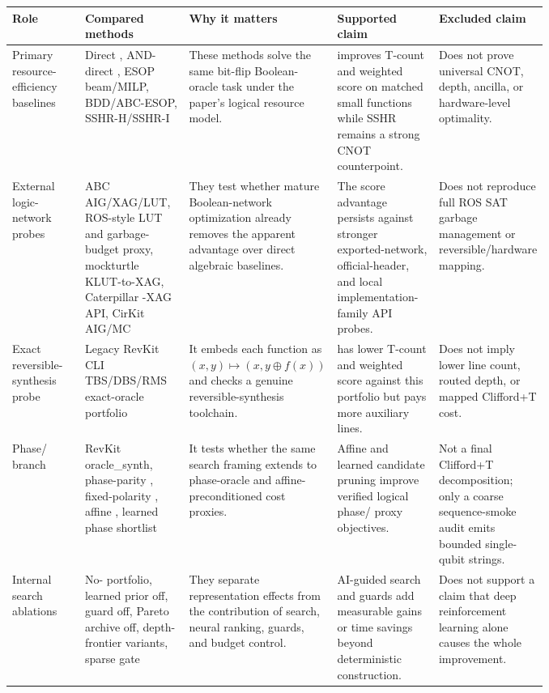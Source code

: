\begin{tabularx}{\linewidth}{>{\raggedright\arraybackslash}p{0.16\linewidth}>{\raggedright\arraybackslash}p{0.21\linewidth}>{\raggedright\arraybackslash}X>{\raggedright\arraybackslash}p{0.21\linewidth}>{\raggedright\arraybackslash}p{0.19\linewidth}}
\toprule
Role & Compared methods & Why it matters & Supported claim & Excluded claim \\
\midrule
Primary resource-efficiency baselines & Direct \anf{}, AND-direct \anf{}, ESOP beam/MILP, BDD/ABC-ESOP, SSHR-H/SSHR-I & These methods solve the same bit-flip Boolean-oracle task under the paper's logical resource model. & \method{} improves T-count and weighted score on matched small functions while SSHR remains a strong CNOT counterpoint. & Does not prove universal CNOT, depth, ancilla, or hardware-level optimality. \\
External logic-network probes & ABC AIG/XAG/LUT, ROS-style LUT and garbage-budget proxy, mockturtle KLUT-to-XAG, Caterpillar \anf{}-XAG API, CirKit AIG/MC & They test whether mature Boolean-network optimization already removes the apparent advantage over direct algebraic baselines. & The score advantage persists against stronger exported-network, official-header, and local implementation-family API probes. & Does not reproduce full ROS SAT garbage management or reversible/hardware mapping. \\
Exact reversible-synthesis probe & Legacy RevKit CLI TBS/DBS/RMS exact-oracle portfolio & It embeds each function as $(x,y)\mapsto(x,y\oplus f(x))$ and checks a genuine reversible-synthesis toolchain. & \method{} has lower T-count and weighted score against this portfolio but pays more auxiliary lines. & Does not imply lower line count, routed depth, or mapped Clifford+T cost. \\
Phase/\rz{} branch & RevKit oracle\_synth, phase-parity \anf{}, fixed-polarity \fprm{}, affine \fprm{}, learned phase shortlist & It tests whether the same search framing extends to phase-oracle and affine-preconditioned \rz{} cost proxies. & Affine and learned candidate pruning improve verified logical phase/\rz{} proxy objectives. & Not a final Clifford+T decomposition; only a coarse sequence-smoke audit emits bounded single-qubit strings. \\
Internal search ablations & No-\mcts{} portfolio, learned prior off, guard off, Pareto archive off, depth-frontier variants, sparse gate & They separate representation effects from the contribution of search, neural ranking, guards, and budget control. & AI-guided search and guards add measurable gains or time savings beyond deterministic construction. & Does not support a claim that deep reinforcement learning alone causes the whole improvement. \\

\end{tabularx}
